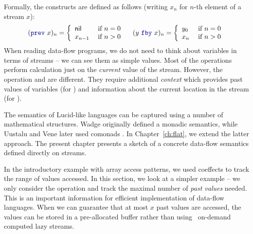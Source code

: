 Formally, the constructs are defined as follows (writing $x_n$ for $n$-th element of a stream $x$):
%
\[
(\kvd{prev}~x)_n = \left\{
  \begin{array}{ll}
    \ident{nil}     & \; \text{if $n=0$}\\
    x_{n-1} & \; \text{if $n>0$}
  \end{array} \right.
\quad
(y~\kvd{fby}~x)_n = \left\{
  \begin{array}{ll}
    y_0     & \; \text{if $n=0$}\\
    x_n     & \; \text{if $n>0$}
  \end{array} \right.
\]
%
When reading data-flow programs, we do not need to think about variables in terms of streams --
we can see them as simple values. Most of the operations perform calculation just on the
\emph{current} value of the stream. However, the operation  and  are different.
They require additional \emph{context} which provides past values of variables
(for ) and information about the current location in the stream (for ).

The semantics of Lucid-like languages can be captured using a number of mathematical
structures. Wadge \cite{app-lucid-monads} originally defined a monadic semantics, while Uustalu
and Vene later used comonads \cite{app-dataflow-essence}. In Chapter~\ref{ch:flat}, we extend
the latter approach. The present chapter presents a sketch of a concrete data-flow semantics
defined directly on streams.

In the introductory example with array access patterns, we used coeffects to track the range
of values accessed. In this section, we look at a simpler example -- we only consider the
 operation and track the maximal number of \emph{past values} needed. This is an
important information for efficient implementation of data-flow languages. When we can guarantee
that at most $x$ past values are accessed, the values can be stored in a pre-allocated buffer
rather than using \eg~on-demand computed lazy streams.


